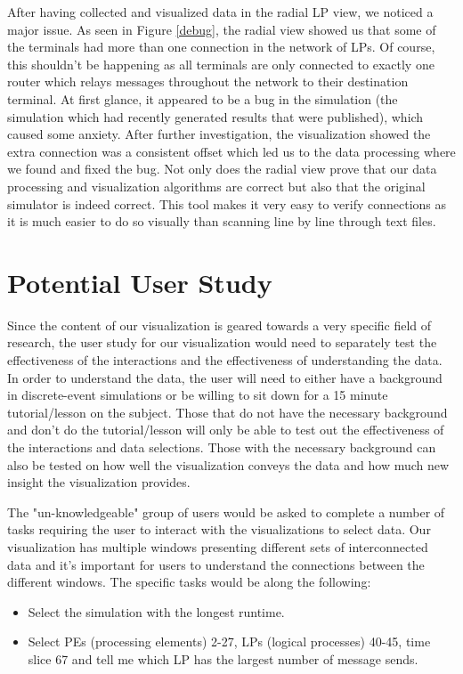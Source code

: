 \documentclass{acm_proc_article-sp}
\begin{document}
After having collected and visualized data in the radial LP view, we noticed a major issue. As seen in Figure \ref{debug}, the radial view showed us that some of the terminals had more than one connection in the network of LPs. Of course, this shouldn't be happening as all terminals are only connected to exactly one router which relays messages throughout the network to their destination terminal. At first glance, it appeared to be a bug in the simulation (the simulation which had recently generated results that were published), which caused some anxiety. After further investigation, the visualization showed the extra connection was a consistent offset which led us to the data processing where we found and fixed the bug. Not only does the radial view prove that our data processing and visualization algorithms are correct but also that the original simulator is indeed correct. This tool makes it very easy to verify connections as it is much easier to do so visually than scanning line by line through text files.

\section{Potential User Study}
Since the content of our visualization is geared towards a very specific field of research, the user study for our visualization would need to separately test the effectiveness of the interactions and the effectiveness of understanding the data. In order to understand the data, the user will need to either have a background in discrete-event simulations or be willing to sit down for a 15 minute tutorial/lesson on the subject. Those that do not have the necessary background and don't do the tutorial/lesson will only be able to test out the effectiveness of the interactions and data selections. Those with the necessary background can also be tested on how well the visualization conveys the data and how much new insight the visualization provides.

The "un-knowledgeable" group of users would be asked to complete a number of tasks requiring the user to interact with the visualizations to select data. Our visualization has multiple windows presenting different sets of interconnected data and it's important for users to understand the connections between the different windows. The specific tasks would be along the following:
\begin{itemize}
  \item Select the simulation with the longest runtime. 
  \item Select PEs (processing elements) 2-27,  LPs (logical processes) 40-45, time slice 67 and tell me which LP has the largest number of message sends.
\end{itemize}
  
\end{document}
